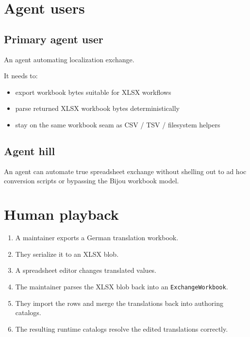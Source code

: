 \section{Agent users}\label{record-193-agent-users}

\subsection{Primary agent user}\label{record-193-primary-agent-user}

An agent automating localization exchange.

It needs to:

\begin{itemize}
\tightlist
\item
  export workbook bytes suitable for XLSX workflows
\item
  parse returned XLSX workbook bytes deterministically
\item
  stay on the same workbook seam as CSV / TSV / filesystem helpers
\end{itemize}

\subsection{Agent hill}\label{record-193-agent-hill}

An agent can automate true spreadsheet exchange without shelling out to ad hoc conversion scripts or bypassing the Bijou workbook model.

\section{Human playback}\label{record-193-human-playback}

\begin{enumerate}
\def\labelenumi{\arabic{enumi}.}
\tightlist
\item
  A maintainer exports a German translation workbook.
\item
  They serialize it to an XLSX blob.
\item
  A spreadsheet editor changes translated values.
\item
  The maintainer parses the XLSX blob back into an \texttt{E\allowbreak{}x\allowbreak{}c\allowbreak{}h\allowbreak{}a\allowbreak{}n\allowbreak{}g\allowbreak{}e\allowbreak{}W\allowbreak{}o\allowbreak{}r\allowbreak{}k\allowbreak{}b\allowbreak{}o\allowbreak{}o\allowbreak{}k}.
\item
  They import the rows and merge the translations back into authoring catalogs.
\item
  The resulting runtime catalogs resolve the edited translations correctly.
\end{enumerate}

